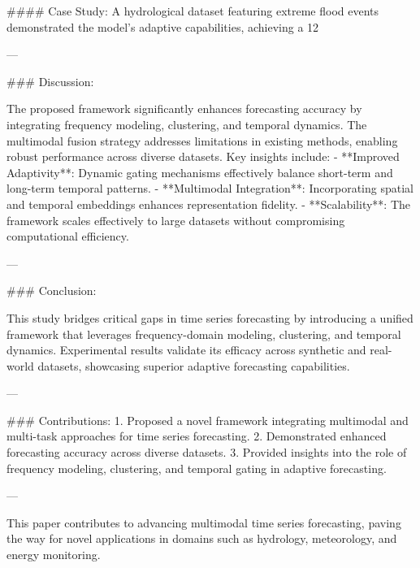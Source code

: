 #### Case Study:
A hydrological dataset featuring extreme flood events demonstrated the model's adaptive capabilities, achieving a 12%

---

### Discussion:

The proposed framework significantly enhances forecasting accuracy by integrating frequency modeling, clustering, and temporal dynamics. The multimodal fusion strategy addresses limitations in existing methods, enabling robust performance across diverse datasets. Key insights include:
- **Improved Adaptivity**: Dynamic gating mechanisms effectively balance short-term and long-term temporal patterns.
- **Multimodal Integration**: Incorporating spatial and temporal embeddings enhances representation fidelity.
- **Scalability**: The framework scales effectively to large datasets without compromising computational efficiency.

---

### Conclusion:

This study bridges critical gaps in time series forecasting by introducing a unified framework that leverages frequency-domain modeling, clustering, and temporal dynamics. Experimental results validate its efficacy across synthetic and real-world datasets, showcasing superior adaptive forecasting capabilities.

---

### Contributions:
1. Proposed a novel framework integrating multimodal and multi-task approaches for time series forecasting.
2. Demonstrated enhanced forecasting accuracy across diverse datasets.
3. Provided insights into the role of frequency modeling, clustering, and temporal gating in adaptive forecasting.

--- 

This paper contributes to advancing multimodal time series forecasting, paving the way for novel applications in domains such as hydrology, meteorology, and energy monitoring.